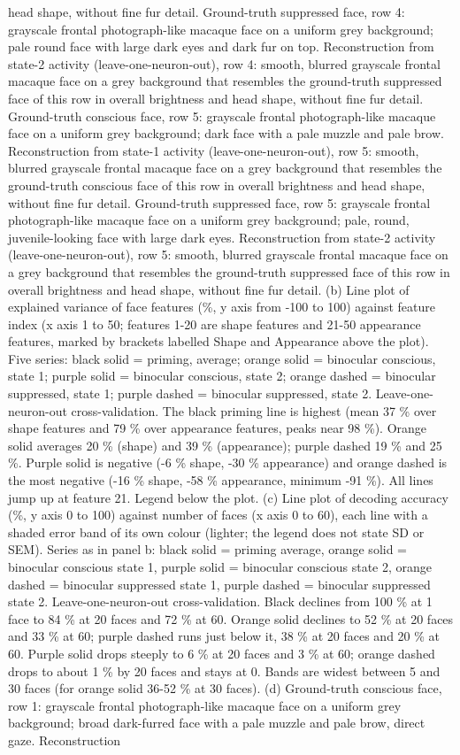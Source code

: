 \documentclass{article}
\begin{document}
head shape, without fine fur detail. Ground-truth suppressed face, row 4: grayscale frontal photograph-like macaque face on a uniform grey background; pale round face with large dark eyes and dark fur on top. Reconstruction from state-2 activity (leave-one-neuron-out), row 4: smooth, blurred grayscale frontal macaque face on a grey background that resembles the ground-truth suppressed face of this row in overall brightness and head shape, without fine fur detail. Ground-truth conscious face, row 5: grayscale frontal photograph-like macaque face on a uniform grey background; dark face with a pale muzzle and pale brow. Reconstruction from state-1 activity (leave-one-neuron-out), row 5: smooth, blurred grayscale frontal macaque face on a grey background that resembles the ground-truth conscious face of this row in overall brightness and head shape, without fine fur detail. Ground-truth suppressed face, row 5: grayscale frontal photograph-like macaque face on a uniform grey background; pale, round, juvenile-looking face with large dark eyes. Reconstruction from state-2 activity (leave-one-neuron-out), row 5: smooth, blurred grayscale frontal macaque face on a grey background that resembles the ground-truth suppressed face of this row in overall brightness and head shape, without fine fur detail. (b) Line plot of explained variance of face features (\%, y axis from -100 to 100) against feature index (x axis 1 to 50; features 1-20 are shape features and 21-50 appearance features, marked by brackets labelled Shape and Appearance above the plot). Five series: black solid = priming, average; orange solid = binocular conscious, state 1; purple solid = binocular conscious, state 2; orange dashed = binocular suppressed, state 1; purple dashed = binocular suppressed, state 2. Leave-one-neuron-out cross-validation. The black priming line is highest (mean 37 \% over shape features and 79 \% over appearance features, peaks near 98 \%). Orange solid averages 20 \% (shape) and 39 \% (appearance); purple dashed 19 \% and 25 \%. Purple solid is negative (-6 \% shape, -30 \% appearance) and orange dashed is the most negative (-16 \% shape, -58 \% appearance, minimum -91 \%). All lines jump up at feature 21. Legend below the plot. (c) Line plot of decoding accuracy (\%, y axis 0 to 100) against number of faces (x axis 0 to 60), each line with a shaded error band of its own colour (lighter; the legend does not state SD or SEM). Series as in panel b: black solid = priming average, orange solid = binocular conscious state 1, purple solid = binocular conscious state 2, orange dashed = binocular suppressed state 1, purple dashed = binocular suppressed state 2. Leave-one-neuron-out cross-validation. Black declines from 100 \% at 1 face to 84 \% at 20 faces and 72 \% at 60. Orange solid declines to 52 \% at 20 faces and 33 \% at 60; purple dashed runs just below it, 38 \% at 20 faces and 20 \% at 60. Purple solid drops steeply to 6 \% at 20 faces and 3 \% at 60; orange dashed drops to about 1 \% by 20 faces and stays at 0. Bands are widest between 5 and 30 faces (for orange solid 36-52 \% at 30 faces). (d) Ground-truth conscious face, row 1: grayscale frontal photograph-like macaque face on a uniform grey background; broad dark-furred face with a pale muzzle and pale brow, direct gaze. Reconstruction 
\end{document}
